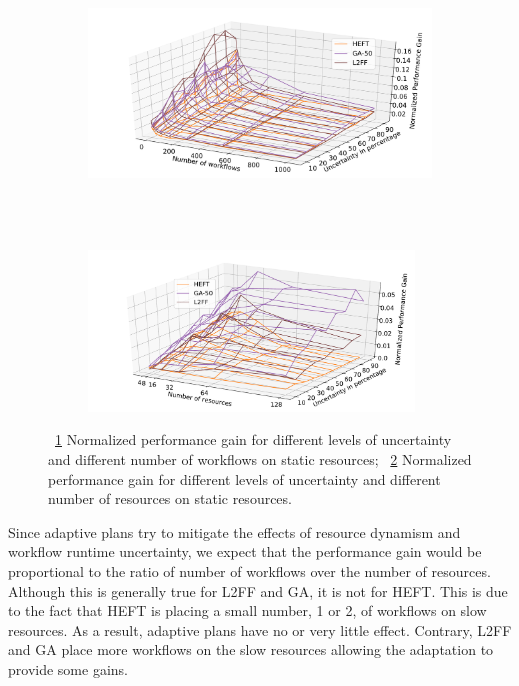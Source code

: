 \begin{figure}[ht!]
    \centering
    \begin{subfigure}[b]{0.95\textwidth}
        \includegraphics[width=.95\textwidth]{figures/campaign/InaccurStHeteroCampaigns_4DynHeteroResourcesGain.pdf}
        \caption{}
        \label{fig:InaccurStHeteroCampaigns_4DynHeteroResourcesGain}
    \end{subfigure}\\
    ~ 
    \begin{subfigure}[b]{0.95\textwidth}
        \includegraphics[width=0.95\textwidth]{figures/campaign/InaccurDynHeteroResources_StHeteroCampaignsGain.pdf}
        \caption{}
        \label{fig:InaccurDynHeteroResources_StHeteroCampaignsGain}
    \end{subfigure}
    \caption{~\ref{fig:InaccurStHeteroCampaigns_4DynHeteroResourcesGain} Normalized performance gain for different levels of uncertainty and different number of workflows on static resources;
    ~\ref{fig:InaccurDynHeteroResources_StHeteroCampaignsGain} Normalized performance gain for different levels of uncertainty and different number of resources on static resources.}
    \label{fig:gain_dyn}
\end{figure}

Since adaptive plans try to mitigate the effects of resource dynamism and workflow runtime uncertainty, we expect that the performance gain would be proportional to the ratio of number of workflows over the number of resources.
Although this is generally true for L2FF and GA, it is not for HEFT.
This is due to the fact that HEFT is placing a small number, 1 or 2, of workflows on slow resources.
As a result, adaptive plans have no or very little effect.
Contrary, L2FF and GA place more workflows on the slow resources allowing the adaptation to provide some gains.

